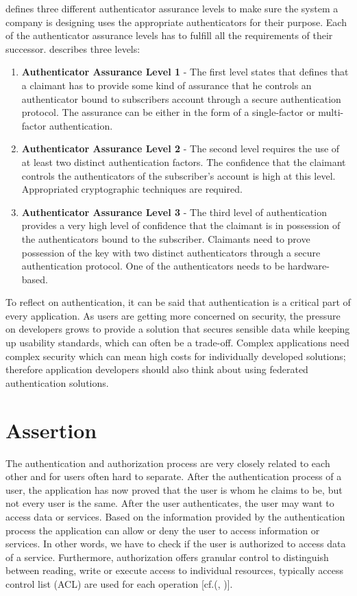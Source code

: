 \cite{NIST:2017:DIGAL} defines three different authenticator assurance levels to make sure the system a company is designing uses the appropriate authenticators for their purpose. Each of the authenticator assurance levels has to fulfill all the requirements of their successor. \cite{NIST:2017:DIGAL} describes three levels: 
\begin{enumerate}
	\item \textbf{Authenticator Assurance Level 1} - The first level states that defines that a claimant has to provide some kind of assurance that he controls an authenticator bound to subscribers account through a secure authentication protocol. The assurance can be either in the form of a single-factor or multi-factor authentication.
	\item \textbf{Authenticator Assurance Level 2} - The second level requires the use of at least two distinct authentication factors. The confidence that the claimant controls the authenticators of the subscriber's account is high at this level. Appropriated cryptographic techniques are required.  
	\item \textbf{Authenticator Assurance Level 3} - The third level of authentication provides a very high level of confidence that the claimant is in possession of the authenticators bound to the subscriber. Claimants need to prove possession of the key with two distinct authenticators through a secure authentication protocol. One of the authenticators needs to be hardware-based.
\end{enumerate}



To reflect on authentication, it can be said that authentication is a critical part of every application. As users are getting more concerned on security, the pressure on developers grows to provide a solution that secures sensible data while keeping up usability standards, which can often be a trade-off. Complex applications need complex security which can mean high costs for individually developed solutions; therefore application developers should also think about using federated authentication solutions.


\section{Assertion}
The authentication and authorization process are very closely related to each other and for users often hard to separate. After the authentication process of a user, the application has now proved that the user is whom he claims to be, but not every user is the same. After the user authenticates, the user may want to access data or services. Based on the information provided by the authentication process the application can allow or deny the user to access information or services. In other words, we have to check if the user is authorized to access data of a service. Furthermore, authorization offers granular control to distinguish between reading, write or execute access to individual resources, typically access control list (ACL) are used for each operation [cf.(\cite{Todorov:2007:MUI}, \cite{Boyed:2012:GSOA})].

